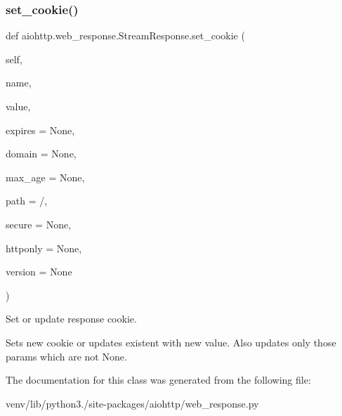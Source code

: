 \subsubsection{\texorpdfstring{set\+\_\+cookie()}{set\_cookie()}}
{\footnotesize\ttfamily def aiohttp.\+web\+\_\+response.\+Stream\+Response.\+set\+\_\+cookie (\begin{DoxyParamCaption}\item[{}]{self,  }\item[{}]{name,  }\item[{}]{value,  }\item[{}]{expires = {\ttfamily None},  }\item[{}]{domain = {\ttfamily None},  }\item[{}]{max\+\_\+age = {\ttfamily None},  }\item[{}]{path = {\ttfamily \textquotesingle{}/\textquotesingle{}},  }\item[{}]{secure = {\ttfamily None},  }\item[{}]{httponly = {\ttfamily None},  }\item[{}]{version = {\ttfamily None} }\end{DoxyParamCaption})}

\begin{DoxyVerb}Set or update response cookie.

Sets new cookie or updates existent with new value.
Also updates only those params which are not None.
\end{DoxyVerb}
 

The documentation for this class was generated from the following file\+:\begin{DoxyCompactItemize}
\item 
venv/lib/python3./site-\/packages/aiohttp/web\+\_\+response.\+py\end{DoxyCompactItemize}
